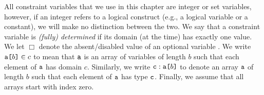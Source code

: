 
All constraint variables that we use in this chapter are integer or set
variables, however, if an integer refers to a logical construct (e.g., a logical
variable or a constant), we will make no distinction between the two. We say
that a constraint variable is \emph{(fully) determined} if its domain (at the
time) has exactly one value. We let $\Box$ denote the absent/disabled value of
an optional variable \citep{DBLP:conf/cpaior/MearsSSTMW14}. We write
$\arrayd{a}{b}{c}$ to mean that $\variable{a}$ is an array of variables of
length $b$ such that each element of $\variable{a}$ has domain $c$. Similarly,
we write $\arrayt{a}{b}{c}$ to denote an array $\variable{a}$ of length $b$ such
that each element of $\variable{a}$ has type $\variable{c}$. Finally, we assume
that all arrays start with index zero.

